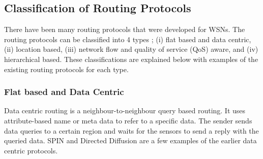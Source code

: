 \subsection{Classification of Routing Protocols}
There have been many routing protocols that were developed for WSNs. The routing protocols can be classified into 4 types \cite{akkaya2005survey}; (i) flat based and data centric, (ii) location based, (iii) network flow and quality of service (QoS) aware, and (iv) hierarchical based. These classifications are explained below with examples of the existing routing protocols for each type.



\subsubsection{Flat based and Data Centric}
Data centric routing is a neighbour-to-neighbour query based routing. It uses attribute-based name or meta data to refer to a specific data. The sender sends data queries to a certain region and waits for the sensors to send a reply with the queried data. SPIN \cite{spin} and Directed Diffusion \cite{directeddiffusion} are a few examples of the earlier data centric protocols. 

